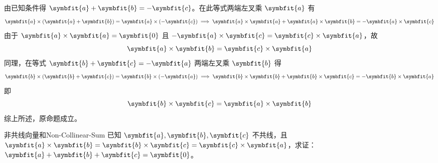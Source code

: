 \begin{myproof}
    由已知条件得 $\symbfit{a} + \symbfit{b} = -\symbfit{c}$。在此等式两端左叉乘 $\symbfit{a}$ 有
    \begin{equation}
        \symbfit{a} \times (\symbfit{a} + \symbfit{b}) = \symbfit{a} \times (-\symbfit{c}) \implies \symbfit{a} \times \symbfit{a} + \symbfit{a} \times \symbfit{b} = -\symbfit{a} \times \symbfit{c}
    \end{equation}
    由于 $\symbfit{a} \times \symbfit{a} = \symbfit{0}$ 且 $-\symbfit{a} \times \symbfit{c} = \symbfit{c} \times \symbfit{a}$，故
    \begin{equation}
        \symbfit{a} \times \symbfit{b} = \symbfit{c} \times \symbfit{a}
    \end{equation}
    同理，在等式 $\symbfit{b} + \symbfit{c} = -\symbfit{a}$ 两端左叉乘 $\symbfit{b}$ 得
    \begin{equation}
        \symbfit{b} \times (\symbfit{b} + \symbfit{c}) = \symbfit{b} \times (-\symbfit{a}) \implies \symbfit{b} \times \symbfit{b} + \symbfit{b} \times \symbfit{c} = -\symbfit{b} \times \symbfit{a}
    \end{equation}
    即
    \begin{equation}
        \symbfit{b} \times \symbfit{c} = \symbfit{a} \times \symbfit{b}
    \end{equation}
    综上所述，原命题成立。
\end{myproof}


\begin{problem}{非共线向量和}{Non-Collinear-Sum}
    已知 $\symbfit{a}, \symbfit{b}, \symbfit{c}$ 不共线，且 $\symbfit{a} \times \symbfit{b} = \symbfit{b} \times \symbfit{c} = \symbfit{c} \times \symbfit{a}$，求证：$\symbfit{a} + \symbfit{b} + \symbfit{c} = \symbfit{0}$。
\end{problem}

